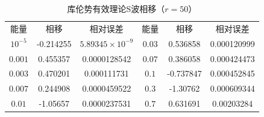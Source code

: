 \documentclass[cs4size,titlepage,twoside]{ctexart}
\begin{document}
\begin{table}[!tp]
	\centering
	\begin{tabular}{|cccccc|}
		\hline
		能量    & 相移    & 相对误差           & 能量 & 相移    & 相对误差 \\
		$10^{-5}$ & -0.214255 & $5.89345\times10^{-9}$ & $0.03$ & 0.536858  & 0.000120999  \\
		$0.001$   & 0.455357  & 0.0000128542           & $0.07$ & 0.386058  & 0.000424473  \\
		$0.003$   & 0.470201  & 0.000111731            & $0.1$  & -0.737847 & 0.000452845  \\
		$0.007$   & 0.244908  & 0.0000459522           & $0.3$  & -1.30762  & 0.000609344  \\
		$0.01$    & -1.05657  & 0.0000237531           & $0.7$  & 0.631691  & 0.00203284   \\
		\hline
	\end{tabular}
	\caption{库伦势有效理论S波相移（$r=50$）}\label{psCV}
\end{table}
\end{document}
